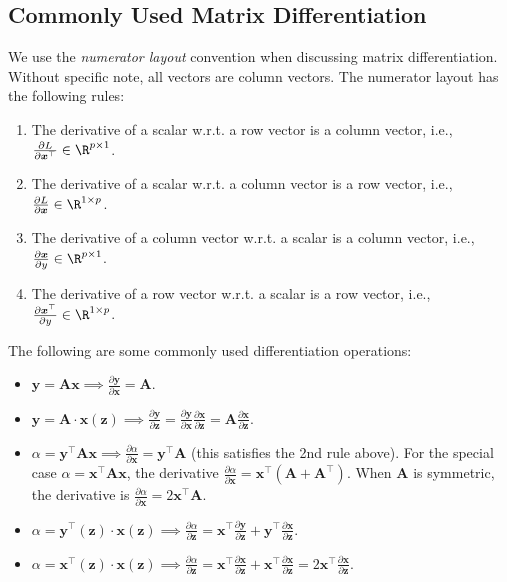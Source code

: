 

\subsection{Commonly Used Matrix Differentiation}
    We use the \emph{numerator layout} convention when discussing matrix differentiation.
    Without specific note, all vectors are column vectors.
    The numerator layout has the following rules:
        \begin{enumerate}
            \item The derivative of a scalar w.r.t. a row vector is a column vector, i.e., $\frac{\partial L}{\partial \bm{x}^\top} \in \R^{\nfeat \times 1}$.
            \item The derivative of a scalar w.r.t. a column vector is a row vector, i.e., $\frac{\partial L}{\partial \bm{x} } \in \R^{1 \times \nfeat}$.
            \item The derivative of a column vector w.r.t. a scalar is a column vector, i.e., $\frac{\partial \bm{x}}{\partial y } \in \R^{ \nfeat \times 1}$.
            \item The derivative of a row vector w.r.t. a scalar is a row vector, i.e., $\frac{\partial \bm{x}^\top }{\partial y } \in \R^{ 1 \times \nfeat}$.
        \end{enumerate}
    The following are some commonly used differentiation operations:
        \begin{itemize}
            \item $\bm{y} = \bm{A} \bm{x} \implies \frac{\partial \bm{y}}{\partial \bm{x}} = \bm{A}$.
            \item $\bm{y} = \bm{A} \cdot  \bm{x}(\bm{z}) \implies \frac{\partial \bm{y}}{\partial \bm{z}} = \frac{\partial \bm{y}}{\partial \bm{x}} \frac{\partial \bm{x}}{\partial \bm{z}} = \bm{A} \frac{\partial \bm{x}}{\partial \bm{z}}$.
            \item $\alpha = \bm{y}^\top \bm{A} \bm{x} \implies \frac{\partial \alpha}{\partial \bm{x}} = \bm{y}^\top \bm{A}$ (this satisfies the 2nd rule above). For the special case $\alpha = \bm{x}^\top \bm{A} \bm{x}$, the derivative $\frac{\partial \alpha}{\partial \bm{x}} = \bm{x}^\top (\bm{A} + \bm{A}^\top)$. When $\bm{A}$ is symmetric, the derivative is $\frac{\partial \alpha}{\partial \bm{x}} = 2\bm{x}^\top \bm{A}$.
            \item $\alpha = \bm{y}^\top(\bm{z}) \cdot \bm{x}(\bm{z}) \implies \frac{\partial \alpha}{\partial \bm{z}} = \bm{x}^\top \frac{\partial \bm{y}}{\partial \bm{z}} + \bm{y}^\top \frac{\partial \bm{x}}{\partial \bm{z}}$.
            \item $\alpha = \bm{x}^\top(\bm{z}) \cdot \bm{x}(\bm{z}) \implies \frac{\partial \alpha}{\partial \bm{z}} = \bm{x}^\top \frac{\partial \bm{x}}{\partial \bm{z}} + \bm{x}^\top \frac{\partial \bm{x}}{\partial \bm{z}} = 2\bm{x}^\top \frac{\partial \bm{x}}{\partial \bm{z}}$.
        \end{itemize}
        
